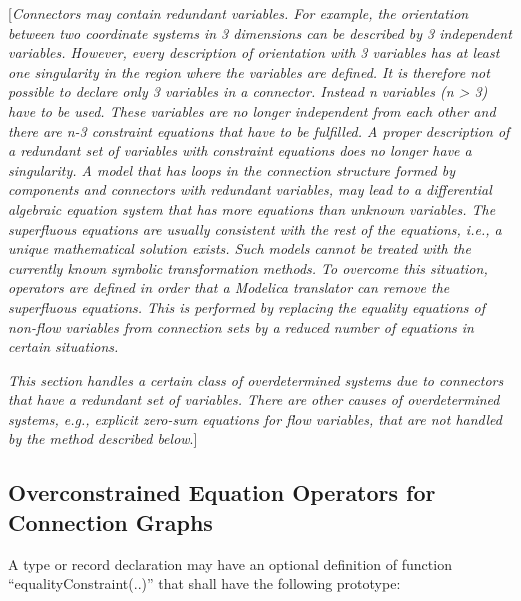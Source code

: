 \documentclass[10pt,a4paper]{report}
\def\doublelabel#1{\label{#1}\hypertarget{#1}{}}
\begin{document}
{[}\emph{Connectors may contain redundant variables. For example, the
orientation between two coordinate systems in 3 dimensions can be
described by 3 independent variables. However, every description of
orientation with 3 variables has at least one singularity in the region
where the variables are defined. It is therefore not possible to declare
only 3 variables in a connector. Instead n variables (n \textgreater{}
3) have to be used. These variables are no longer independent from each
other and there are n-3 constraint equations that have to be fulfilled.
A proper description of a redundant set of variables with constraint
equations does no longer have a singularity. A model that has loops in
the connection structure formed by components and connectors with
redundant variables, may lead to a differential algebraic equation
system that has more equations than unknown variables. The superfluous
equations are usually consistent with the rest of the equations, i.e., a
unique mathematical solution exists. Such models cannot be treated with
the currently known symbolic transformation methods. To overcome this
situation, operators are defined in order that a Modelica translator can
remove the superfluous equations. This is performed by replacing the
equality equations of non-flow variables from connection sets by a
reduced number of equations in certain situations.}

\emph{This section handles a certain class of overdetermined systems due
to connectors that have a redundant set of variables. There are other
causes of overdetermined systems, e.g., explicit zero-sum equations for
flow variables, that are not handled by the method described below}.{]}

\subsection{Overconstrained Equation Operators for Connection Graphs}\doublelabel{overconstrained-equation-operators-for-connection-graphs}

A type or record declaration may have an optional definition of function
``equalityConstraint(..)'' that shall have the following prototype:
\end{document}
